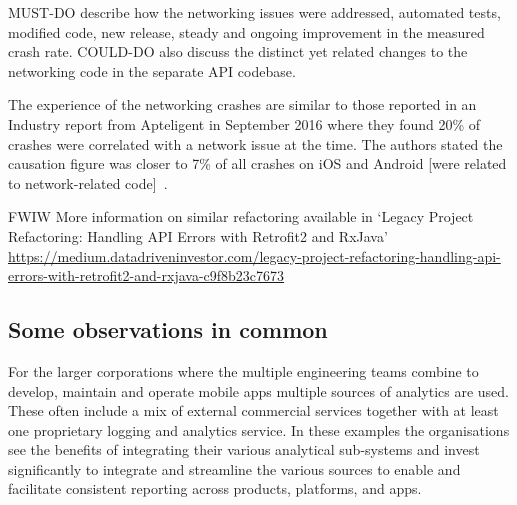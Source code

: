 MUST-DO describe how the networking issues were addressed, automated tests, modified code, new release, steady and ongoing improvement in the measured crash rate. COULD-DO also discuss the distinct yet related changes to the networking code in the separate API codebase.

The experience of the networking crashes are similar to those reported in an Industry report from Apteligent in September 2016 where they found 20\% of crashes were correlated with a network issue at the time. The authors stated the causation figure was closer to 7\% of all crashes on iOS and Android [were related to network-related code]~\citep{apteligent2016_data_report_network_crash_edition}. %

FWIW More information on similar refactoring available in `Legacy Project Refactoring: Handling API Errors with Retrofit2 and RxJava' \url{https://medium.datadriveninvestor.com/legacy-project-refactoring-handling-api-errors-with-retrofit2-and-rxjava-c9f8b23c7673}


\subsection{Some observations in common}
For the larger corporations where the multiple engineering teams combine to develop, maintain and operate mobile apps multiple sources of analytics are used. These often include a mix of external commercial services together with at least one proprietary logging and analytics service. In these examples the organisations see the benefits of integrating their various analytical sub-systems and invest significantly to integrate and streamline the various sources to enable and facilitate consistent reporting across products, platforms, and apps.
